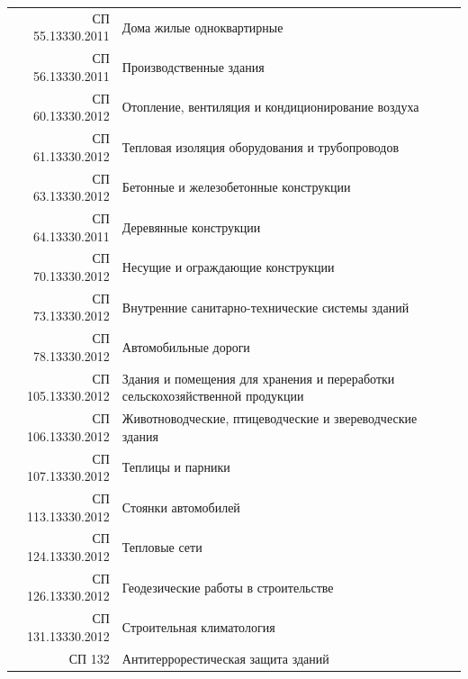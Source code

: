 \documentclass[10pt, twocolumn]{report}
\begin{document}
\begin{tabular}{rl}
СП 55.13330.2011 & Дома жилые одноквартирные \\
СП 56.13330.2011 & Производственные здания \\
СП 60.13330.2012 & Отопление, вентиляция и кондиционирование воздуха \\
СП 61.13330.2012 & Тепловая изоляция оборудования и трубопроводов \\
СП 63.13330.2012 & Бетонные и железобетонные конструкции \\
СП 64.13330.2011 & Деревянные конструкции \\
СП 70.13330.2012 & Несущие и ограждающие конструкции \\
СП 73.13330.2012 & Внутренние санитарно-технические системы зданий \\
СП 78.13330.2012 & Автомобильные дороги \\
СП 105.13330.2012 & Здания и помещения для хранения и переработки сельскохозяйственной продукции \\
СП 106.13330.2012 & Животноводческие, птицеводческие и звереводческие здания \\
СП 107.13330.2012 & Теплицы и парники \\
СП 113.13330.2012 & Стоянки автомобилей \\
СП 124.13330.2012 & Тепловые сети \\
СП 126.13330.2012 & Геодезические работы в строительстве \\
СП 131.13330.2012 & Строительная климатология \\
СП 132 & Антитеррорестическая защита зданий \\
\end{tabular}

\newpage



\end{document}
